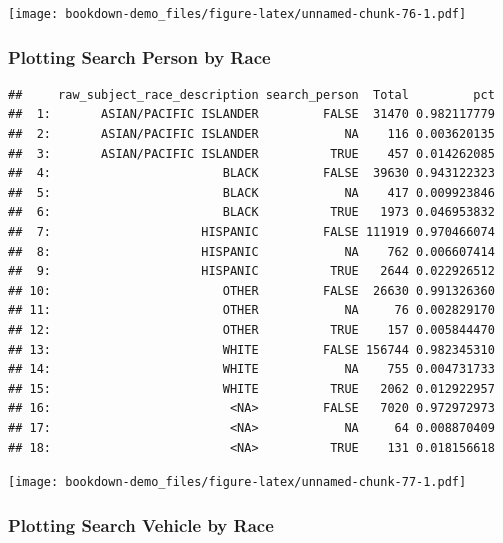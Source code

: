 \documentclass[
]{book}
\begin{document}
\texttt{[image: bookdown-demo\_files/figure-latex/unnamed-chunk-76-1.pdf]}

\hypertarget{plotting-search-person-by-race}{%
\subsubsection{Plotting Search Person by Race}\label{plotting-search-person-by-race}}

\begin{verbatim}
##     raw_subject_race_description search_person  Total         pct
##  1:       ASIAN/PACIFIC ISLANDER         FALSE  31470 0.982117779
##  2:       ASIAN/PACIFIC ISLANDER            NA    116 0.003620135
##  3:       ASIAN/PACIFIC ISLANDER          TRUE    457 0.014262085
##  4:                        BLACK         FALSE  39630 0.943122323
##  5:                        BLACK            NA    417 0.009923846
##  6:                        BLACK          TRUE   1973 0.046953832
##  7:                     HISPANIC         FALSE 111919 0.970466074
##  8:                     HISPANIC            NA    762 0.006607414
##  9:                     HISPANIC          TRUE   2644 0.022926512
## 10:                        OTHER         FALSE  26630 0.991326360
## 11:                        OTHER            NA     76 0.002829170
## 12:                        OTHER          TRUE    157 0.005844470
## 13:                        WHITE         FALSE 156744 0.982345310
## 14:                        WHITE            NA    755 0.004731733
## 15:                        WHITE          TRUE   2062 0.012922957
## 16:                         <NA>         FALSE   7020 0.972972973
## 17:                         <NA>            NA     64 0.008870409
## 18:                         <NA>          TRUE    131 0.018156618
\end{verbatim}

\texttt{[image: bookdown-demo\_files/figure-latex/unnamed-chunk-77-1.pdf]}

\hypertarget{plotting-search-vehicle-by-race}{%
\subsubsection{Plotting Search Vehicle by Race}\label{plotting-search-vehicle-by-race}}
\end{document}
